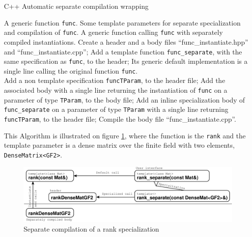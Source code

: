\documentclass[runningheads,a4paper]{llncs}
\begin{document}
\begin{algorithm}[ht]
\caption{C++ Automatic separate compilation wrapping}\label{alg:sep}
\begin{algorithmic}[1]
\REQUIRE A generic function \texttt{func}.
\REQUIRE Some template parameters for separate specialization and
compilation of  \texttt{func}.
\ENSURE A generic function calling
\texttt{func} with separately compiled instantiations.
\STATE Create a header and a body files ``func\_instantiate.hpp'' and ``func\_instantiate.cpp'';
\STATE Add a template function \texttt{func\_separate}, with the same
specification as \texttt{func}, to the header;
\STATE Its generic default implementation is a single line calling the
original function \texttt{func}.\\ 
  \STATE Add  a non template specification
  \texttt{funcTParam}, to the header file;
  \STATE Add the associated body with a
  single line returning the instantiation of
  \texttt{func} on a parameter of type \texttt{TParam}, to the body file;
  \STATE Add an inline specialization
  body of \texttt{func\_separate} on a parameter of type
  \texttt{TParam} with a single line returning \texttt{funcTParam}, to
  the header file; 
\ENDFOR
\STATE Compile the body file ``func\_instantiate.cpp''.
\end{algorithmic}
\end{algorithm}

This Algorithm is illustrated on figure \ref{fig:sep}, where
the function is the \texttt{rank} and the template parameter is a dense
matrix over the finite field with two elements,
\texttt{DenseMatrix<GF2>}.
\begin{figure}[ht]
\includegraphics[width=\textwidth]{separate}
\caption{Separate compilation of a rank specialization}\label{fig:sep}
\end{figure}
\end{document}
